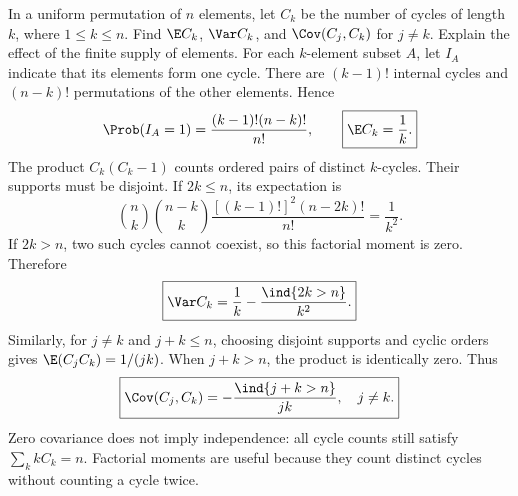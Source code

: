 In a uniform permutation of $n$ elements, let $C_k$ be the number of cycles of length $k$, where $1\le k\le n$. Find $\E C_k$, $\Var C_k$, and $\Cov(C_j,C_k)$ for $j\ne k$. Explain the effect of the finite supply of elements.
\solution For each $k$-element subset $A$, let $I_A$ indicate that its elements form one cycle. There are $(k-1)!$ internal cycles and $(n-k)!$ permutations of the other elements. Hence
\[
\Prob(I_A=1)=\frac{(k-1)!(n-k)!}{n!},
\qquad \boxed{\E C_k=\frac1k.}
\]
The product $C_k(C_k-1)$ counts ordered pairs of distinct $k$-cycles. Their supports must be disjoint. If $2k\le n$, its expectation is
\[
\binom nk\binom{n-k}k
\frac{[(k-1)!]^2(n-2k)!}{n!}=\frac1{k^2}.
\]
If $2k>n$, two such cycles cannot coexist, so this factorial moment is zero. Therefore
\[
\boxed{\Var C_k=\frac1k-\frac{\ind\{2k>n\}}{k^2}.}
\]
Similarly, for $j\ne k$ and $j+k\le n$, choosing disjoint supports and cyclic orders gives $\E(C_jC_k)=1/(jk)$. When $j+k>n$, the product is identically zero. Thus
\[
\boxed{\Cov(C_j,C_k)=-\frac{\ind\{j+k>n\}}{jk},\quad j\ne k.}
\]
\pitfall Zero covariance does not imply independence: all cycle counts still satisfy $\sum_k kC_k=n$. Factorial moments are useful because they count distinct cycles without counting a cycle twice.
